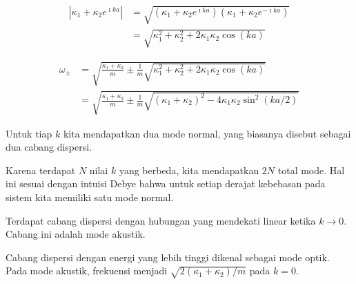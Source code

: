 \begin{align}
\left| \kappa_{1} + \kappa_{2} e^{\imath ka} \right| & = 
\sqrt{( \kappa_{1} + \kappa_{2} e^{\imath ka} )
  ( \kappa_{1} + \kappa_{2} e^{-\imath ka} ) } \\
& = \sqrt{ \kappa_{1}^{2} + \kappa_{2}^{2} + 2\kappa_{1} \kappa_{2} \cos(ka) }
\end{align}


\begin{align}
\omega_{\pm} & = \sqrt{\frac{\kappa_{1} + \kappa_{2}}{m} \pm
\frac{1}{m}\sqrt{ \kappa_{1}^{2} + \kappa_{2}^{2} + 2\kappa_{1} \kappa_{2} \cos(ka) }
} \\
& = \sqrt{\frac{\kappa_{1} + \kappa_{2}}{m} \pm
\frac{1}{m}\sqrt{ (\kappa_{1} + \kappa_{2})^{2} - 4\kappa_{1} \kappa_{2} \sin^{2}(ka/2) }
}
\end{align}

Untuk tiap \(k\) kita mendapatkan dua mode normal, yang biasanya disebut
sebagai dua cabang dispersi.

Karena terdapat \(N\) nilai \(k\) yang berbeda, kita mendapatkan \(2N\)
total mode. Hal ini sesuai dengan intuisi Debye bahwa untuk setiap
derajat kebebasan pada sistem kita memiliki satu mode normal.

Terdapat cabang dispersi dengan hubungan yang mendekati linear ketika
\(k \rightarrow 0\). Cabang ini adalah mode akustik.

Cabang dispersi dengan energi yang lebih tinggi dikenal sebagai mode
optik. Pada mode akustik, frekuensi menjadi
\(\sqrt{2(\kappa_{1} + \kappa_{2})/m}\) pada \(k = 0\).
